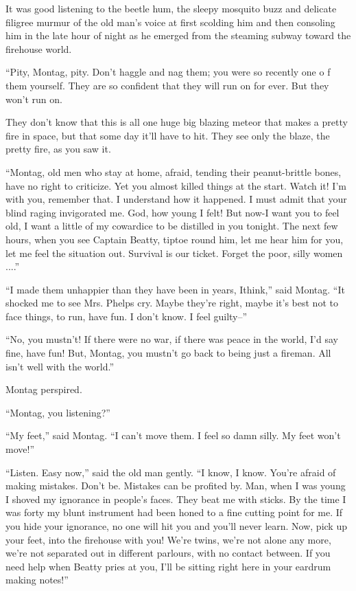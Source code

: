 \documentclass[11pt,openany]{book}
\begin{document}
It was good listening to the beetle hum, the sleepy mosquito buzz and delicate filigree murmur of the old man's voice at first scolding him and then consoling him in the late hour of night as he emerged from the steaming subway toward the firehouse world.

``Pity, Montag, pity. Don't haggle and nag them; you were so recently one o f them yourself. They are so confident that they will run on for ever. But they won't run on.

They don't know that this is all one huge big blazing meteor that makes a pretty fire in space, but that some day it'll have to hit. They see only the blaze, the pretty fire, as you saw it.

``Montag, old men who stay at home, afraid, tending their peanut-brittle bones, have no right to criticize. Yet you almost killed things at the start. Watch it! I'm with you, remember that. I understand how it happened. I must admit that your blind raging invigorated me. God, how young I felt! But now-I want you to feel old, I want a little of my cowardice to be distilled in you tonight. The next few hours, when you see Captain Beatty, tiptoe round him, let me hear him for you, let me feel the situation out. Survival is our ticket. Forget the poor, silly women ....''

``I made them unhappier than they have been in years, Ithink,'' said Montag. ``It shocked me to see Mrs. Phelps cry. Maybe they're right, maybe it's best not to face things, to run, have fun. I don't know. I feel guilty--''

``No, you mustn't! If there were no war, if there was peace in the world, I'd say fine, have fun! But, Montag, you mustn't go back to being just a fireman. All isn't well with the world.''

Montag perspired.

``Montag, you listening?''

``My feet,'' said Montag. ``I can't move them. I feel so damn silly. My feet won't move!''

``Listen. Easy now,'' said the old man gently. ``I know, I know. You're afraid of making mistakes. Don't be. Mistakes can be profited by. Man, when I was young I shoved my ignorance in people's faces. They beat me with sticks. By the time I was forty my blunt instrument had been honed to a fine cutting point for me. If you hide your ignorance, no one will hit you and you'll never learn. Now, pick up your feet, into the firehouse with you! We're twins, we're not alone any more, we're not separated out in different parlours, with no contact between. If you need help when Beatty pries at you, I'll be sitting right here in your eardrum making notes!''
\end{document}
